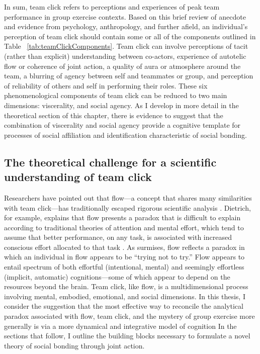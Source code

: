 \begin{CJK}{UTF8}{gbsn}
In sum, team click refers to perceptions and experiences of peak team performance in group exercise contexts.  Based on this brief review of anecdote and evidence from psychology, anthropology, and further afield, an individual's perception of team click should contain some or all of the components outlined in Table ~\ref{tab:teamClickComponents}.  Team click can involve perceptions of tacit (rather than explicit) understanding between co-actors, experience of autotelic flow or coherence of joint action, a quality of aura or atmosphere around the team, a blurring of agency between self and teammates or group, and perception of reliability of others and self in performing their roles.  These six phenomenological components of team click can be reduced to two main dimensions: viscerality, and social agency.  As I develop in more detail in the theoretical section of this chapter, there is evidence to suggest that the combination of viscerality and social agency provide a cognitive template for processes of social affiliation and identification characteristic of social bonding.



\subsection{The theoretical challenge for a scientific understanding of team click}
Researchers have pointed out that flow---a concept that shares many similarities with team click---has traditionally escaped rigorous scientific analysis \citep{Dietrich2010a,Slingerland2014}.  Dietrich, for example, explains that flow presents a paradox that is difficult to explain according to traditional theories of attention and mental effort, which tend to assume that better performance, on any task, is associated with increased conscious effort allocated to that task \citep{Dietrich2004b}.  As \textcite{Slingerland2014} surmises, flow reflects a paradox in which an individual in flow appears to be ``trying not to try.''  Flow appears to entail spectrum of both effortful (intentional, mental) and seemingly effortless (implicit, automatic) cognitions---some of which appear to depend on the resources beyond the brain.  Team click, like flow, is a multidimensional process involving mental, embodied, emotional, and social dimensions.  In this thesis, I consider the suggestion that the most effective way to reconcile the analytical paradox associated with flow, team click, and the mystery of group exercise more generally is via a more dynamical and integrative model of cognition \citep{Clark2015}  In the sections that follow, I outline the building blocks necessary to formulate a novel theory of social bonding through joint action.



\end{CJK}
